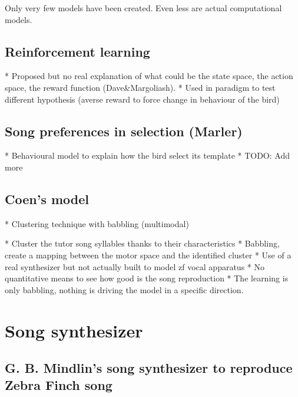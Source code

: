 \documentclass{report}
\begin{document}
Only very few models have been created. Even less are actual
computational models.

\subsection{Reinforcement learning} \label{reinforcement-learning}

  * Proposed but no real explanation of what could be the state space, the
  action space, the reward function (Dave\&Margoliash).
  * Used in paradigm to test different hypothesis (averse reward to force
  change in behaviour of the bird)

\subsection{Song preferences in selection
(Marler)} \label{song-preferences-in-selection-marler}

  * Behavioural model to explain how the bird select its template
  * TODO: Add more

\subsection{Coen's model} \label{coens-model}

  * Clustering technique with babbling (multimodal)

      * Cluster the tutor song syllables thanks to their characteristics
      * Babbling, create a mapping between the motor space and the
    identified cluster
    * Use of a real synthesizer but not actually built to model zf vocal
  apparatus
  * No quantitative means to see how good is the song reproduction
  * The learning is only babbling, nothing is driving the model in a
  specific direction.

\section{Song synthesizer}\label{song-synthesizer}

\subsection{G. B. Mindlin's song synthesizer to reproduce Zebra Finch song}
\label{description-of-perl-song-synthesizer-to-reproduce-zebra-finch-song}
\end{document}
